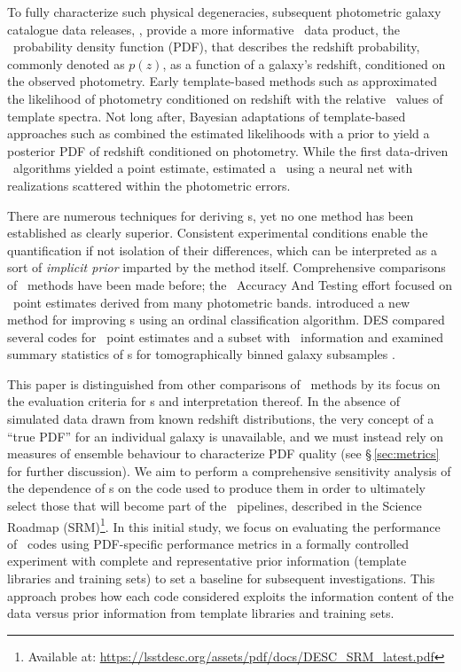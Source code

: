 To fully characterize such physical degeneracies, subsequent photometric galaxy catalogue data releases, \citep[e.~g.~][]{Sheldon:2012, Erben:2013, de_Jong:17}, provide a more informative \pz\ data product, the \pz\ probability density function (PDF), that describes the redshift probability, commonly denoted as $p(z)$, as a function of a galaxy's redshift, conditioned on the observed photometry.
Early template-based methods such as \citet{Fernandezsoto:99} approximated the likelihood of photometry conditioned on redshift with the relative \chisq\ values of template spectra.
Not long after, Bayesian adaptations of template-based approaches such as \citet{Benitez:00} combined the estimated likelihoods with a prior to yield a posterior PDF of redshift conditioned on photometry.
While the first data-driven \pz\ algorithms yielded a point estimate, \citet{Firth:03} estimated a \pzpdf\ using a neural net with realizations scattered within the photometric errors.

There are numerous techniques for deriving \pzpdf s, yet no one method has been established as clearly superior.
Consistent experimental conditions enable the quantification if not isolation of their differences, which can be interpreted as a sort of \textit{implicit prior} imparted by the method itself.
Comprehensive comparisons of \pz\ methods have been made before; the \Pz\ Accuracy And Testing \citep[\textsc{PHAT},][]{Hildebrandt:10} effort focused on \pz\ point estimates derived from many photometric bands.
\citet{Rau:2015} introduced a new method for improving \pzpdf s using an ordinal classification algorithm.
\textsc{DES} compared several codes for \pz\ point estimates and a subset with \pzpdf\ information \citep{Sanchez:14} and examined summary statistics of \pzpdf s for tomographically binned galaxy subsamples \citep{Bonnett:16}.

This paper is distinguished from other comparisons of \pz\ methods by its focus on the evaluation criteria for \pzpdf s and interpretation thereof.
In the absence of simulated data drawn from known redshift distributions, the very concept of a ``true PDF'' for an individual galaxy is unavailable, and we must instead rely on measures of ensemble behaviour to characterize PDF quality (see \S\,\ref{sec:metrics} for further discussion).
We aim to perform a comprehensive sensitivity analysis of the dependence of \pzpdf s on the code used to produce them in order to ultimately select those that will become part of the \lsstdesc\ pipelines, described in the Science Roadmap (SRM)\footnote{Available at: \url{https://lsstdesc.org/assets/pdf/docs/DESC_SRM_latest.pdf}}.
In this initial study, we focus on evaluating the performance of \pzpdf\ codes using PDF-specific performance metrics in a formally controlled experiment with complete and representative prior information (template libraries and training sets) to set a baseline for subsequent investigations.
This approach probes how each code considered exploits the information content of the data versus prior information from template libraries and training sets.

